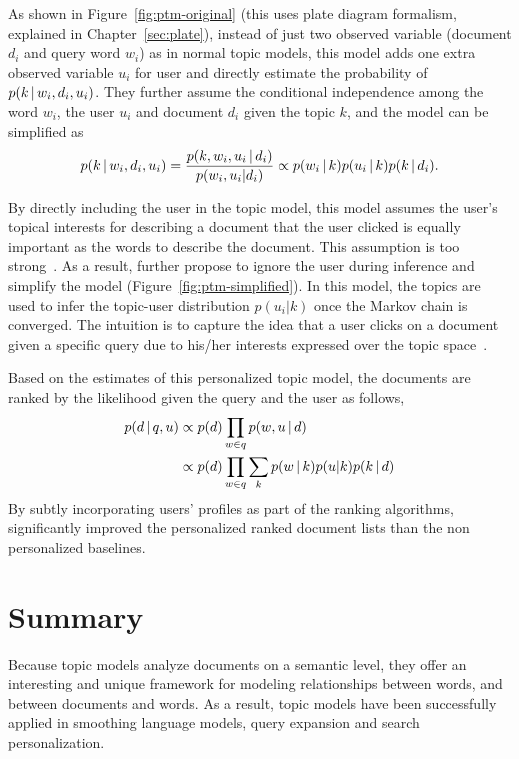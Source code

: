 
As shown in Figure~\ref{fig:ptm-original} (this uses plate diagram
formalism, explained in Chapter~\ref{sec:plate}), instead of just two
observed variable (document $d_i$ and query word $w_i$) as in normal
topic models, this model adds one extra observed variable $u_i$ for
user and directly estimate the probability of $p(k \, | \, w_i, d_i,
u_i)$.
They further assume the conditional independence among the word $w_i$,
the user $u_i$ and document $d_i$ given the topic $k$, and the model
can be simplified as
\begin{align}
p(k \, | \, w_i, d_i, u_i) = \frac{p(k,w_i, u_i  \, | \,  d_i)}{p(w_i, u_i | d_i)} \propto p(w_i \, | \, k) p(u_i \, | \, k) p (k \, | \, d_i).
\end{align}

By directly including the user in the topic model, this model assumes
the user's topical interests for describing a document that the user
clicked is equally important as the words to describe the
document. This assumption is too strong~\citep{Carman-2010}. As a
result, \citet{Harvey-2013} further propose to ignore the user during
inference and simplify the model (Figure~\ref{fig:ptm-simplified}). In
this model, the topics are used to infer the topic-user distribution
$p(u_i|k)$ once the Markov chain is converged. The intuition is to
capture the idea that a user clicks on a document given a specific
query due to his/her interests expressed over the topic
space~\citep{Harvey-2013}.

Based on the estimates of this personalized topic model, the documents are ranked by the likelihood given the query and the user as follows,
\begin{align}
p(d  \, | \,  q,u) &\propto p(d) \prod_{w \in q} p(w, u  \, | \,  d)\\
&\propto p(d) \prod_{w \in q} \sum_k p(w \, | \, k) p(u|k) p(k \, | \, d) \notag
\end{align}
By subtly incorporating users' profiles as part of the ranking algorithms, \citet{Harvey-2013} significantly improved the personalized ranked document lists than the non personalized baselines.

\section{Summary}

Because topic models analyze documents on a semantic level, they offer
an interesting and unique framework for modeling relationships between words, and between documents and words.
As a result, topic models have been
successfully applied in smoothing language models, query expansion and search personalization.


